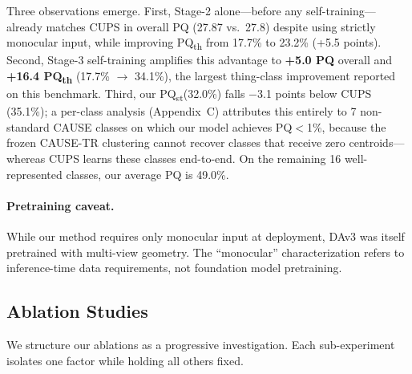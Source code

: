 \documentclass{bmvc2k}
\newcommand{\pqt}{PQ\textsubscript{th}\xspace}
\newcommand{\pqs}{PQ\textsubscript{st}\xspace}
\begin{document}
Three observations emerge. First, Stage-2 alone---before any self-training---already matches CUPS in overall PQ (27.87 vs.\ 27.8) despite using strictly monocular input, while improving \pqt from 17.7\% to 23.2\% (+5.5 points). Second, Stage-3 self-training amplifies this advantage to \textbf{+5.0 PQ} overall and \textbf{+16.4 \pqt} (17.7\% $\to$ 34.1\%), the largest thing-class improvement reported on this benchmark. Third, our \pqs (32.0\%) falls $-$3.1 points below CUPS (35.1\%); a per-class analysis (Appendix~C) attributes this entirely to 7 non-standard CAUSE classes on which our model achieves PQ$<$1\%, because the frozen CAUSE-TR clustering cannot recover classes that receive zero centroids---whereas CUPS learns these classes end-to-end. On the remaining 16 well-represented classes, our average PQ is 49.0\%.

\paragraph{Pretraining caveat.}
While our method requires only monocular input at deployment, DAv3 was itself pretrained with multi-view geometry. The ``monocular'' characterization refers to inference-time data requirements, not foundation model pretraining.

\subsection{Ablation Studies}
\label{sec:ablations}

We structure our ablations as a progressive investigation. Each sub-experiment isolates one factor while holding all others fixed.
\end{document}
